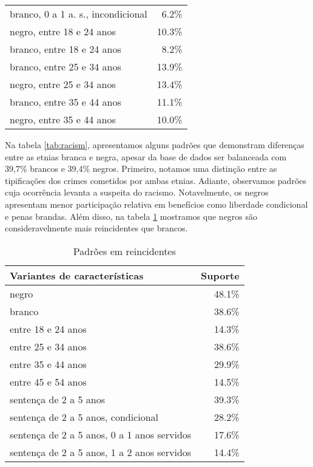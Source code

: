 \documentclass[12pt]{article}
\begin{document}
\begin{table}[h!]
\begin{multicols}{2}
\begin{tabular}{lr}
branco, 0 a 1 a. s., incondicional & 6.2\%\\
\arrayrulecolor{darkgray}\hline
negro, entre 18 e 24 anos & 10.3\%\\
branco, entre 18 e 24 anos & 8.2\%\\
\arrayrulecolor{lightgray}\hline
branco, entre 25 e 34 anos & 13.9\%\\
negro, entre 25 e 34 anos & 13.4\%\\
\arrayrulecolor{lightgray}\hline
branco, entre 35 e 44 anos & 11.1\%\\
negro, entre 35 e 44 anos & 10.0\%
\end{tabular}
\end{multicols}
\end{table} \vspace{-23pt}
Na tabela \ref{tab:racism}, apresentamos alguns padrões que demonstram diferenças entre as etnias branca e negra, apesar da base de dados ser balanceada com 39,7\% brancos e 39,4\% negros. Primeiro, notamos uma distinção entre as tipificações dos crimes cometidos por ambas etnias. Adiante, observamos padrões cuja ocorrência levanta a suspeita do racismo. Notavelmente, os negros apresentam menor participação relativa em benefícios como liberdade condicional e penas brandas. Além disso, na tabela \ref{tab:recidivists} mostramos que negros são consideravelmente mais reincidentes que brancos.

\begin{table}[h!]
\caption{Padrões em reincidentes}
\label{tab:recidivists}
\centering
\begin{tabular}{lr}
Variantes de características & Suporte\\
\hline
negro & 48.1\%\\
branco & 38.6\%\\
\arrayrulecolor{lightgray}\hline
entre 18 e 24 anos & 14.3\%\\
entre 25 e 34 anos & 38.6\%\\
entre 35 e 44 anos & 29.9\%\\
entre 45 e 54 anos & 14.5\%\\
\arrayrulecolor{lightgray}\hline
sentença de 2 a 5 anos & 39.3\%\\
sentença de 2 a 5 anos, condicional & 28.2\%\\
sentença de 2 a 5 anos, 0 a 1 anos servidos & 17.6\%\\
sentença de 2 a 5 anos, 1 a 2 anos servidos & 14.4\%
\end{tabular}
\end{table}
\end{document}
